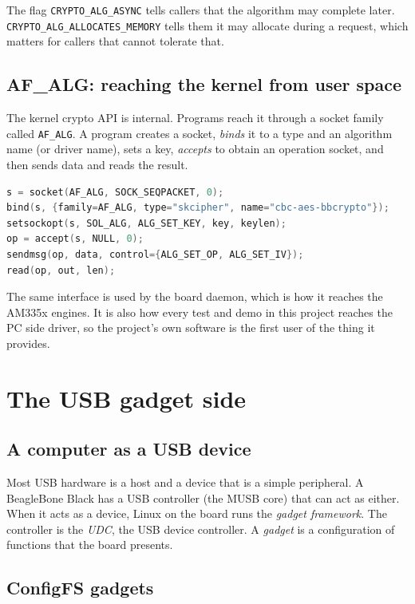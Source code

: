 \documentclass[11pt,a4paper,oneside]{report}
\newcommand{\code}[1]{\texttt{\small #1}}
\begin{document}
The flag \code{CRYPTO\_ALG\_ASYNC} tells callers that the algorithm may complete later. \code{CRYPTO\_ALG\_ALLOCATES\_MEMORY} tells them it may allocate during a request, which matters for callers that cannot tolerate that.

\section{AF\_ALG: reaching the kernel from user space}

The kernel crypto API is internal. Programs reach it through a socket family called \code{AF\_ALG}. A program creates a socket, \emph{binds} it to a type and an algorithm name (or driver name), sets a key, \emph{accepts} to obtain an operation socket, and then sends data and reads the result.

\begin{lstlisting}[language=C]
s = socket(AF_ALG, SOCK_SEQPACKET, 0);
bind(s, {family=AF_ALG, type="skcipher", name="cbc-aes-bbcrypto"});
setsockopt(s, SOL_ALG, ALG_SET_KEY, key, keylen);
op = accept(s, NULL, 0);
sendmsg(op, data, control={ALG_SET_OP, ALG_SET_IV});
read(op, out, len);
\end{lstlisting}

The same interface is used by the board daemon, which is how it reaches the AM335x engines. It is also how every test and demo in this project reaches the PC side driver, so the project's own software is the first user of the thing it provides.



\chapter{The USB gadget side}\label{ch:gadget}

\section{A computer as a USB device}

Most USB hardware is a host and a device that is a simple peripheral. A BeagleBone Black has a USB controller (the MUSB core) that can act as either. When it acts as a device, Linux on the board runs the \emph{gadget framework}. The controller is the \emph{UDC}, the USB device controller. A \emph{gadget} is a configuration of functions that the board presents.

\section{ConfigFS gadgets}
\end{document}
